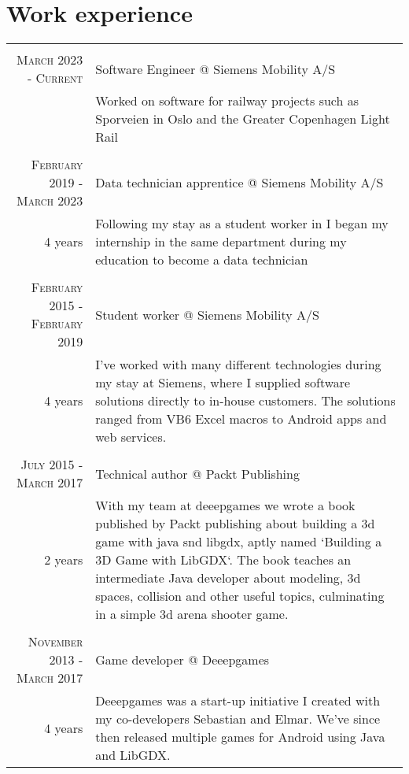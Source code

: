 \documentclass[a4paper,10pt]{article}
\begin{document}
\section{Work experience}
\begin{tabular}{r|p{11cm}}
	\multicolumn{2}{c}{}                                                                       \\
	\textsc{March 2023 - Current}          & Software Engineer @ Siemens Mobility A/S          \\ &\footnotesize{Worked on software for railway projects such as Sporveien in Oslo and the Greater Copenhagen Light Rail}\\

	\multicolumn{2}{c}{}                                                                       \\
	\textsc{February 2019 - March 2023}    & Data technician apprentice @ Siemens Mobility A/S \\ \footnotesize{4 years} &\footnotesize{Following my stay as a student worker in I began my internship in the same department during my education to become a data technician}\\

	\multicolumn{2}{c}{}                                                                       \\
	\textsc{February 2015 - February 2019} & Student worker @ Siemens Mobility A/S             \\ \footnotesize{4 years}&\footnotesize{I’ve worked with many different technologies during my stay at Siemens, where I supplied software solutions directly to in-house customers. The solutions ranged from VB6 Excel macros to Android apps and web services.}\\

	\multicolumn{2}{c}{}                                                                       \\
	\textsc{July 2015 - March 2017}        & Technical author @ Packt Publishing               \\ \footnotesize{2 years}&\footnotesize{With my team at deeepgames we wrote a book published by Packt publishing about building a 3d game with java snd libgdx, aptly named `Building a 3D Game with LibGDX`. The book teaches an intermediate Java developer about modeling, 3d spaces, collision and other useful topics, culminating in a simple 3d arena shooter game.}\\

	\multicolumn{2}{c}{}                                                                       \\
	\textsc{November 2013 - March 2017}    & Game developer @ Deeepgames                       \\ \footnotesize{4 years}&\footnotesize{Deeepgames was a start-up initiative I created with my co-developers Sebastian and Elmar. We've since then released multiple games for Android using Java and LibGDX.}\\


\end{tabular}
\end{document}
